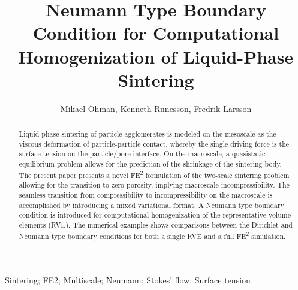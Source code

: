 \documentclass[12pt,a4paper,fleqn]{article}
\title{Neumann Type Boundary Condition for Computational Homogenization of Liquid-Phase Sintering}
\author{Mikael \"Ohman, Kenneth Runesson, Fredrik Larsson}
\begin{document}

\maketitle

\begin{abstract}
\noindent
Liquid phase sintering of particle agglomerates is modeled on the mesoscale as the viscous deformation of particle-particle contact, whereby the single driving force is the surface tension on the particle/pore interface.
On the macroscale, a quasistatic equilibrium problem allows for the prediction of the shrinkage of the sintering body.
The present paper presents a novel FE\textsuperscript{2} formulation of the two-scale sintering problem allowing for the transition to zero porosity, implying macroscale incompressibility.
The seamless transition from compressibility to incompressibility on the macroscale is accomplished by introducing a mixed variational format.
A Neumann type boundary condition is introduced for computational homogenization of the representative volume elements (RVE).
The numerical examples shows comparisons between the Dirichlet and Neumann type boundary conditions for both a single RVE and a full FE\textsuperscript{2} simulation.
\end{abstract}
Sintering; FE2; Multiscale; Neumann; Stokes' flow; Surface tension

\end{document}
